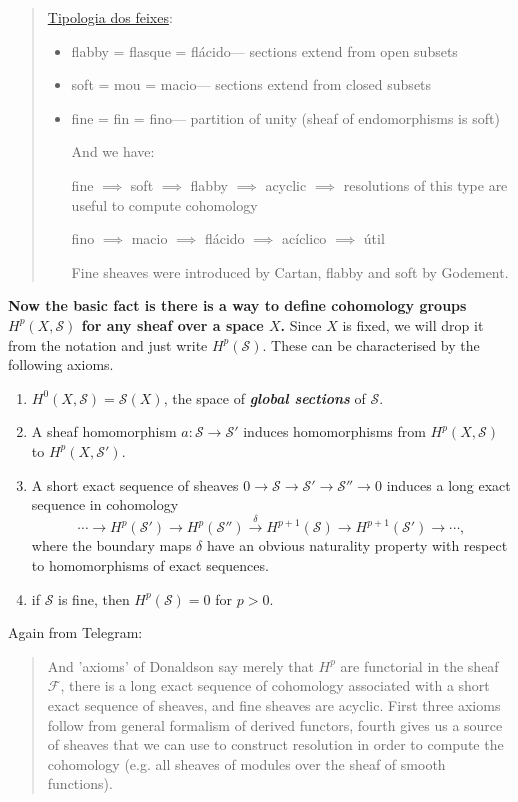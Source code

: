 \documentclass{article}
\newcommand{\Fc}{\mathcal{F}}
\newcommand{\Sc}{\mathcal{S}}
\begin{document}
\begin{quote}
	\href{https://fr.wikipedia.org/wiki/Faisceau_(mathématiques)#Typologie_des_faisceaux}{Tipologia dos feixes}:
	\begin{itemize}
		\item flabby = flasque
			= flácido--- sections extend from open subsets
		\item soft = mou
			= macio--- sections extend from closed subsets
		\item fine = fin
	 		= fino--- partition of unity (sheaf of endomorphisms is soft)
	
	And we have:
	
	fine $\implies$ soft $\implies$ flabby $\implies$ acyclic $\implies$ resolutions of this type are useful to compute cohomology
	
	fino $\implies$ macio $\implies$ flácido $\implies$ acíclico $\implies$ útil

	Fine sheaves were introduced by Cartan, flabby and soft by Godement.
	\end{itemize}
\end{quote}

\textbf{Now the basic fact is there is a way to define cohomology groups $H^p(X,\Sc)$ for any sheaf over a space $X$.} Since $X$ is fixed, we will drop it from the notation and just write $H^p(\Sc)$. These can be characterised by the following axioms.
\begin{enumerate}
	\item $H^0(X,\Sc)=\Sc(X)$, the space of \textbf{\textit{global sections}} of $\Sc$.
	\item A sheaf homomorphism $a:\Sc\to\Sc'$ induces homomorphisms from $H^p(X,\Sc)$ to $H^p(X,\Sc')$.
	\item A short exact sequence of sheaves $0\to\Sc\to\Sc'\to\Sc''\to0$ induces a long exact sequence in cohomology
	\[\cdots\to H^p(\Sc')\to H^p(\Sc'')\overset{\delta}{\to}H^{p+1}(\Sc)\to H^{p+1}(\Sc')\to\cdots,\]
	where the boundary maps $\delta$ have an obvious naturality property with respect to homomorphisms of exact sequences.
	\item if $\Sc$ is fine, then $H^p(\Sc)=0$ for $p>0$.
\end{enumerate}

Again from Telegram:
\begin{quote}
	And 'axioms' of Donaldson say merely that $H^p$ are functorial in the sheaf $\Fc$, there is a long exact sequence of cohomology associated with a short exact sequence of sheaves, and fine sheaves are acyclic. First three axioms follow from general formalism of derived functors, fourth gives us a source of sheaves that we can use to construct resolution in order to compute the cohomology (e.g. all sheaves of modules over the sheaf of smooth functions).
\end{quote}
\end{document}
